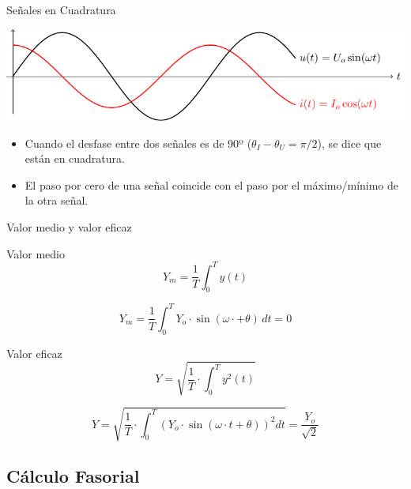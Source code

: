 \documentclass[xcolor={usenames,svgnames,dvipsnames}]{beamer}
\begin{document}
\begin{frame}[label={sec:org3a5af42}]{Señales en Cuadratura}
\begin{center}
\includegraphics[width=.9\linewidth]{../figs/cuadratura.pdf}
\end{center}

\begin{itemize}
\item Cuando el desfase entre dos señales es de 90º (\(\theta_I - \theta_U = \pi/2\)), se dice que están en cuadratura.
\item El paso por cero de una señal coincide con el paso por el máximo/mínimo de la otra señal.
\end{itemize}
\end{frame}


\begin{frame}[label={sec:orga693648}]{Valor medio y valor eficaz}
\begin{block}{Valor medio}
\[
Y_m=\frac{1}{T}\int_{0}^{T}y(t)
\]

\[
Y_m=\frac{1}{T}\int_{0}^{T}Y_{o}\cdot\sin(\omega\cdot+\theta)\, dt=0
\]
\end{block}
\begin{block}{Valor eficaz}
\[
Y = \sqrt{\frac{1}{T}\cdot\int_{0}^{T}y^{2}(t)}
\]

\[
Y=\sqrt{\frac{1}{T}\cdot\int_{0}^{T}\left(Y_{o}\cdot\sin(\omega\cdot t+\theta)\right)^{2}dt}=\frac{Y_{o}}{\sqrt{2}}
\]
\end{block}
\end{frame}
\subsection{Cálculo Fasorial}
\label{sec:org66ff445}
\end{document}
